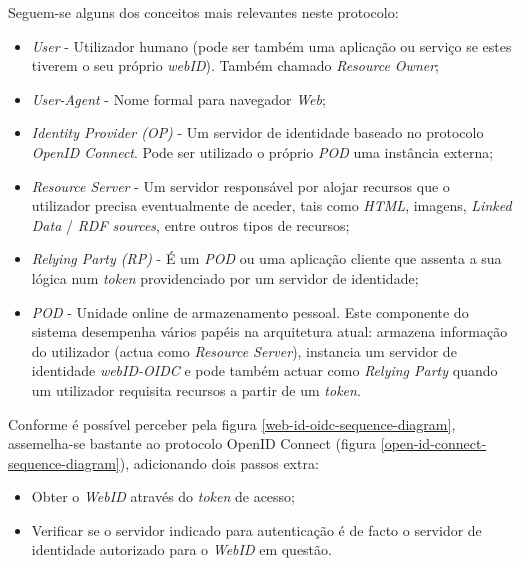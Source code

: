 Seguem-se alguns dos conceitos mais relevantes neste protocolo:
\begin{itemize}
    \item \emph{User} - Utilizador humano (pode ser também uma aplicação ou serviço se estes tiverem o seu próprio \emph{webID}). Também chamado \emph{Resource Owner};
    \item \emph{User-Agent} - Nome formal para navegador \emph{Web};
    \item \emph{Identity Provider (OP)} - Um servidor de identidade baseado no protocolo \emph{OpenID Connect}. Pode ser utilizado o próprio \emph{\acrshort{POD}} uma instância externa;
    \item \emph{Resource Server} - Um servidor responsável por alojar recursos que o utilizador precisa eventualmente de aceder, tais como \emph{HTML}, imagens, \emph{Linked Data} / \emph{RDF sources}, entre outros tipos de recursos;
    \item \emph{Relying Party (RP)} - É um \emph{\acrshort{POD}} ou uma aplicação cliente que assenta a sua lógica num \emph{token} providenciado por um servidor de identidade;
    \item \emph{\acrshort{POD}} - Unidade online de armazenamento pessoal. Este componente do sistema desempenha vários papéis na arquitetura atual: armazena informação do utilizador (actua como \emph{Resource Server}), instancia um servidor de identidade \emph{webID-OIDC} e pode também actuar como \emph{Relying Party} quando um utilizador requisita recursos a partir de um \emph{token}.
\end{itemize}



Conforme é possível perceber pela figura \ref{web-id-oidc-sequence-diagram}, assemelha-se bastante ao protocolo OpenID Connect (figura \ref{open-id-connect-sequence-diagram}), adicionando dois passos extra\cite{solid_webid_oidc}:
\begin{itemize}
    \item Obter o \emph{WebID} através do \emph{token} de acesso;
    \item Verificar se o servidor indicado para autenticação é de facto o servidor de identidade autorizado para o \emph{WebID} em questão.
\end{itemize}


